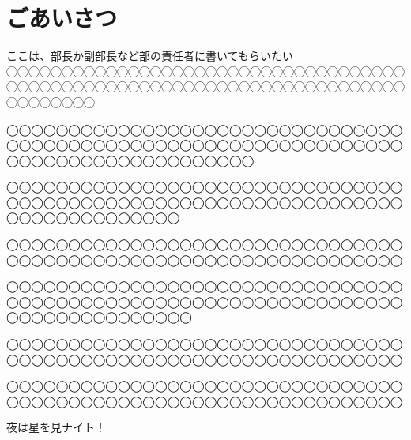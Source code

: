 \documentclass[../main]{subfiles}
\begin{document}
\chapter{ごあいさつ}
\vspace{2\zw}
\begin{center}


	\phantom{a}\par
  ここは、部長か副部長など部の責任者に書いてもらいたい◯◯◯◯◯◯◯◯◯◯◯◯◯◯◯◯◯◯◯◯◯◯◯◯◯◯◯◯◯◯◯◯◯◯◯◯◯◯◯◯◯◯◯◯◯◯◯◯◯◯◯◯◯◯◯◯◯◯◯◯◯◯◯◯◯◯◯◯◯◯◯◯◯◯◯◯◯◯◯◯
	
	
	\phantom{a}\par
	◯◯◯◯◯◯◯◯◯◯◯◯◯◯◯◯◯◯◯◯◯◯◯◯◯◯◯◯◯◯◯◯◯◯◯◯◯◯◯◯◯◯◯◯◯◯◯◯◯◯◯◯◯◯◯◯◯◯◯◯◯◯◯◯◯◯◯◯◯◯◯◯◯◯◯◯◯◯◯◯◯◯◯◯
	
	\phantom{a}\par
  ◯◯◯◯◯◯◯◯◯◯◯◯◯◯◯◯◯◯◯◯◯◯◯◯◯◯◯◯◯◯◯◯◯◯◯◯◯◯◯◯◯◯◯◯◯◯◯◯◯◯◯◯◯◯◯◯◯◯◯◯◯◯◯◯◯◯◯◯◯◯◯◯◯◯◯◯◯◯
	
	
	\phantom{a}\par
  ◯◯◯◯◯◯◯◯◯◯◯◯◯◯◯◯◯◯◯◯◯◯◯◯◯◯◯◯◯◯◯◯◯◯◯◯◯◯◯◯◯◯◯◯◯◯◯◯◯◯◯◯◯◯◯◯◯◯◯◯◯◯◯◯
	
	
	\phantom{a}\par
  ◯◯◯◯◯◯◯◯◯◯◯◯◯◯◯◯◯◯◯◯◯◯◯◯◯◯◯◯◯◯◯◯◯◯◯◯◯◯◯◯◯◯◯◯◯◯◯◯◯◯◯◯◯◯◯◯◯◯◯◯◯◯◯◯◯◯◯◯◯◯◯◯◯◯◯◯◯◯◯
	
	
	\phantom{a}\par
  ◯◯◯◯◯◯◯◯◯◯◯◯◯◯◯◯◯◯◯◯◯◯◯◯◯◯◯◯◯◯◯◯◯◯◯◯◯◯◯◯◯◯◯◯◯◯◯◯◯◯◯◯◯◯◯◯◯◯◯◯◯◯◯◯
	
	
	\phantom{a}\par
  ◯◯◯◯◯◯◯◯◯◯◯◯◯◯◯◯◯◯◯◯◯◯◯◯◯◯◯◯◯◯◯◯◯◯◯◯◯◯◯◯◯◯◯◯◯◯◯◯◯◯◯◯◯◯◯◯◯◯◯◯◯◯◯◯
	
	
	\phantom{a}\par
	夜は星を見ナイト！
	
	
\end{center}
\vspace{5\zw}
\end{document}
